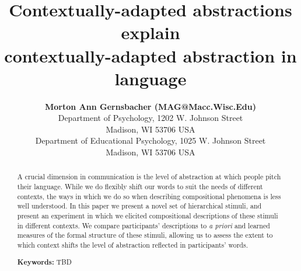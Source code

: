 \documentclass[10pt,letterpaper]{article}
\title{Contextually-adapted abstractions explain \\ contextually-adapted abstraction in language}
\author{{\large \bf Morton Ann Gernsbacher (MAG@Macc.Wisc.Edu)} \\
  Department of Psychology, 1202 W. Johnson Street \\
  Madison, WI 53706 USA
  \AND {\large \bf Sharon J.~Derry (SDJ@Macc.Wisc.Edu)} \\
  Department of Educational Psychology, 1025 W. Johnson Street \\
  Madison, WI 53706 USA}
\begin{document}
\maketitle


\begin{abstract}
A crucial dimension in communication is the level of abstraction at which people pitch their language.
While we do flexibly shift our words to suit the needs of different contexts, the ways in which we do so when describing compositional phenomena is less well understood.
In this paper we present a novel set of hierarchical stimuli, and present an experiment in which we elicited compositional descriptions of these stimuli in different contexts. 
We compare participants' descriptions to \textit{a priori} and learned measures of the formal structure of these stimuli, allowing us to assess the extent to which context shifts the level of abstraction reflected in participants' words.

\textbf{Keywords:} TBD
\end{abstract}
\end{document}
